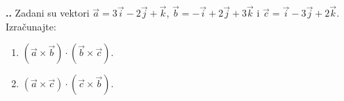 
\noindent 
\textbf{
\thecjelina.\thezadatak.}
Zadani su vektori $\vec{a}=3\vec{i}-2\vec{j}+\vec{k}$,  $\vec{b} = -\vec{i}+2\vec{j}+3\vec{k}$ i $\vec{c}=\vec{i}-3\vec{j}+2\vec{k}$. Izračunajte: 
\begin{enumerate}[label=\alph*)]
 \item $ ( \vec{a}\times \vec{b} )\cdot(\vec{b}\times \vec{c})$.
 \item  $ ( \vec{a}\times \vec{c} )\cdot(\vec{c}\times \vec{b})$.

\end{enumerate}
